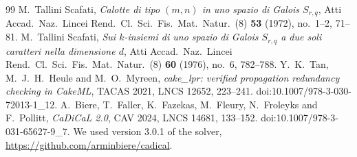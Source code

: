 \documentclass[11pt]{article}
\theoremstyle{plain}
\theoremstyle{remark}
\begin{document}
{\begin{thebibliography}{99}
 M.~Tallini Scafati, \emph{Calotte di tipo $(m,n)$ in uno spazio di Galois $S_{r,q}$}, Atti Accad.\ Naz.\ Lincei Rend.\ Cl.\ Sci.\ Fis.\ Mat.\ Natur.\ (8) \textbf{53} (1972), no.~1--2, 71--81.
 M.~Tallini Scafati, \emph{Sui $k$-insiemi di uno spazio di Galois $S_{r,q}$ a due soli caratteri nella dimensione $d$}, Atti Accad.\ Naz.\ Lincei Rend.\ Cl.\ Sci.\ Fis.\ Mat.\ Natur.\ (8) \textbf{60} (1976), no.~6, 782--788. %
 Y.~K.~Tan, M.~J.~H.~Heule and M.~O.~Myreen, \emph{cake\_lpr: verified propagation redundancy checking in CakeML}, TACAS 2021, LNCS 12652, 223--241. doi:10.1007/978-3-030-72013-1\_12.
 A.~Biere, T.~Faller, K.~Fazekas, M.~Fleury, N.~Froleyks and F.~Pollitt, \emph{CaDiCaL 2.0}, CAV 2024, LNCS 14681, 133--152. doi:10.1007/978-3-031-65627-9\_7. We used version 3.0.1 of the solver, \url{https://github.com/arminbiere/cadical}.
\end{thebibliography}
}
\end{document}
